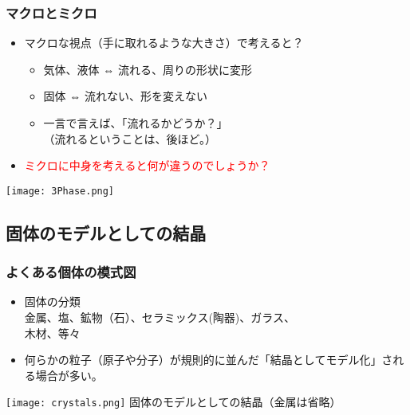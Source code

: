 \documentclass[12pt, dvipdfmx]{beamer}
\begin{document}
\begin{frame}
	\frametitle{マクロとミクロ}
		\begin{itemize}
			\item マクロな視点（手に取れるような大きさ）で考えると？
			\begin{itemize}
				\item 気体、液体 ⇔ 流れる、周りの形状に変形
				\item 固体 ⇔ 流れない、形を変えない
				\item 一言で言えば、「流れるかどうか？」\\
				（流れるということは、後ほど。）
			\end{itemize}
			\item \textcolor{red}{ミクロに中身を考えると何が違うのでしょうか？}
		\end{itemize}
		\begin{center}
			\texttt{[image: 3Phase.png]}
		\end{center}
\end{frame}


\subsection{固体のモデルとしての結晶}
\begin{frame}
	\frametitle{よくある個体の模式図}
		\begin{itemize}
			\item 固体の分類\\
			金属、塩、鉱物（石）、セラミックス(陶器)、ガラス、\\木材、等々
			\item 何らかの粒子（原子や分子）が規則的に並んだ「結晶としてモデル化」される場合が多い。
		\end{itemize}
		\begin{center}
			\texttt{[image: crystals.png]}
			固体のモデルとしての結晶（金属は省略）
		\end{center}
\end{frame}
\end{document}
